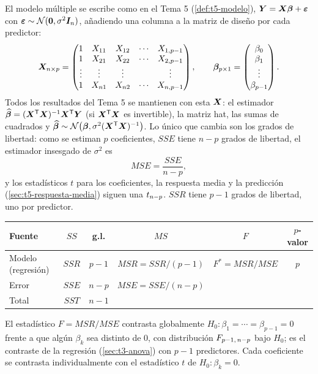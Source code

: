 El modelo múltiple se escribe como en el Tema 5 (\cref{def:t5-modelo}),
$\bm{Y}=\bm{X}\bm{\beta}+\bm{\varepsilon}$ con
$\bm{\varepsilon}\sim\mathcal{N}(\bm{0},\sigma^2\bm{I}_n)$, añadiendo una columna a la matriz de
diseño por cada predictor:
\[
  \bm{X}_{n\times p} =
  \begin{pmatrix}
    1 & X_{11} & X_{12} & \cdots & X_{1,p-1}\\
    1 & X_{21} & X_{22} & \cdots & X_{2,p-1}\\
    \vdots & \vdots & \vdots & & \vdots\\
    1 & X_{n1} & X_{n2} & \cdots & X_{n,p-1}
  \end{pmatrix},
  \qquad
  \bm{\beta}_{p\times1} = \begin{pmatrix} \beta_0\\ \beta_1\\ \vdots\\ \beta_{p-1} \end{pmatrix}.
\]
Todos los resultados del Tema 5 se mantienen con esta $\bm{X}$: el estimador
$\widehat{\bm{\beta}}=(\bm{X}^{\mathsf{T}}\bm{X})^{-1}\bm{X}^{\mathsf{T}}\bm{Y}$ (si $\bm{X}^{\mathsf{T}}\bm{X}$ es invertible), la matriz hat, las sumas de cuadrados y
$\widehat{\bm{\beta}}\sim\mathcal{N}\big(\bm{\beta},\sigma^2(\bm{X}^{\mathsf{T}}\bm{X})^{-1}\big)$. Lo único que cambia son los grados de
libertad: como se estiman $p$ coeficientes, $SSE$ tiene $n-p$ grados de libertad, el estimador
insesgado de $\sigma^2$ es
\[
  MSE = \frac{SSE}{n-p},
\]
y los estadísticos $t$ para los coeficientes, la respuesta media y la predicción
(\cref{sec:t5-respuesta-media}) siguen una $t_{n-p}$. $SSR$ tiene $p-1$ grados de libertad,
uno por predictor.

\begin{center}
  \renewcommand{\arraystretch}{1.3}
  \begin{tabular}{lccccc}
    \toprule
    Fuente & $SS$ & g.l. & $MS$ & $F$ & $p$-valor \\
    \midrule
    Modelo (regresión) & $SSR$ & $p-1$ & $MSR=SSR/(p-1)$ & $F^*=MSR/MSE$ & $p$ \\
    Error & $SSE$ & $n-p$ & $MSE=SSE/(n-p)$ & & \\
    Total & $SST$ & $n-1$ & & & \\
    \bottomrule
  \end{tabular}
\end{center}
El estadístico $F=MSR/MSE$ contrasta globalmente $H_0\colon\beta_1=\cdots=\beta_{p-1}=0$ frente a
que algún $\beta_k$ sea distinto de 0, con distribución $F_{p-1,\,n-p}$ bajo $H_0$; es el
contraste de la regresión (\cref{sec:t3-anova}) con $p-1$ predictores. Cada coeficiente se
contrasta individualmente con el estadístico $t$ de $H_0\colon\beta_k=0$.


